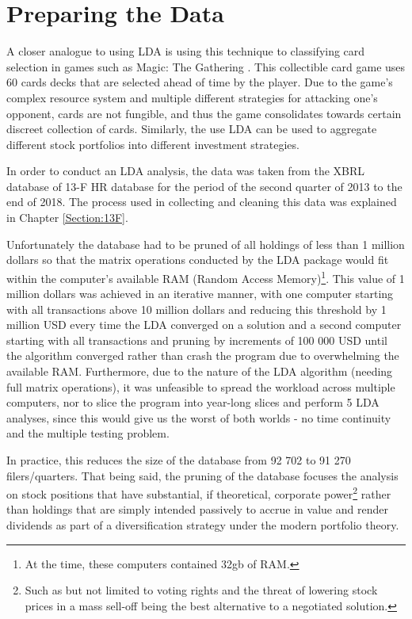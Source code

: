 \section{Preparing the Data}
A closer analogue to using LDA is using this technique to classifying card selection in games such as Magic: The Gathering \citep{Hlynsson2017}.  This collectible card game uses 60 cards decks that are selected ahead of time by the player.  Due to the game's complex resource system and multiple different strategies for attacking one's opponent, cards are not fungible, and thus the game consolidates towards certain discreet collection of cards.  Similarly, the use LDA can be used to aggregate different stock portfolios into different investment strategies.  

In order to conduct an LDA analysis, the data was taken from the XBRL database of 13-F HR database for the period of the second quarter of 2013 to the end of 2018.  The process used in collecting and cleaning this data was explained in Chapter \ref{Section:13F}.  

Unfortunately the database had to be pruned of all holdings of less than 1 million dollars so that the matrix operations conducted by the LDA package would fit within the computer's available RAM (Random Access Memory)\footnote{At the time, these computers contained 32gb of RAM.}.   This value of 1 million dollars was achieved in an iterative manner, with one computer starting with all transactions above 10 million dollars and reducing this threshold by 1 million USD every time the LDA converged on a solution and a second computer starting with all transactions and pruning by increments of 100 000 USD until the algorithm converged rather than crash the program due to overwhelming the available RAM.  Furthermore, due to the nature of the LDA algorithm (needing full matrix operations), it was unfeasible to spread the workload across multiple computers, nor to slice the program into year-long slices and perform 5 LDA analyses, since this would give us the worst of both worlds - no time continuity and the multiple testing problem. 

In practice, this reduces the size of the database from 92 702 to 91 270 filers/quarters.  That being said, the pruning of the database focuses the analysis on stock positions that have substantial, if theoretical, corporate power\footnote{Such as but not limited to voting rights and the threat of lowering stock prices in a mass sell-off being the best alternative to a negotiated solution.} rather than holdings that are simply intended passively to accrue in value and render dividends as part of a diversification strategy under the modern portfolio theory.


